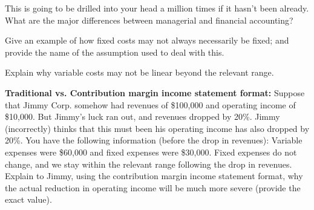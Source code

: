 \documentclass{scrartcl}
\begin{document}
\newpage

This is going to be drilled into your head a million times if it hasn't
been already. What are the major differences between managerial and
financial accounting?

\vspace{10em}

Give an example of how fixed costs may not always necessarily be fixed; and
provide the name of the assumption used to deal with this.

\vspace{10em}

Explain why variable costs may not be linear beyond the relevant range.

\vspace{10em}

\textbf{Traditional vs. Contribution margin income statement format:} 
Suppose that Jimmy Corp. somehow had revenues of \$100,000 and operating
income of \$10,000. But Jimmy's luck ran out, and revenues dropped by
20\%. Jimmy (incorrectly) thinks that this must been his operating
income has also dropped by 20\%. You have the following information
(before the drop in revenues): Variable expenses were \$60,000 and fixed
expenses were \$30,000. Fixed expenses do not change, and we stay
within the relevant range following the drop in revenues. Explain to
Jimmy, using the contribution margin income statement format, why the
actual reduction in operating income will be much more severe (provide
the exact value).

\vspace{10em}
\end{document}
